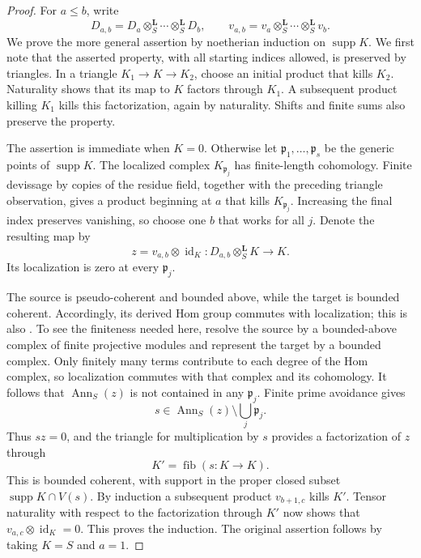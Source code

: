 \documentclass[11pt]{article}
\numberwithin{equation}{section}
\theoremstyle{definition}
\theoremstyle{remark}
\newcommand{\id}{\operatorname{id}}
\newcommand{\fib}{\operatorname{fib}}
\newcommand{\supp}{\operatorname{supp}}
\begin{document}
\begin{proof}
For $a\leq b$, write
\[
 D_{a,b}=D_a\otimes_S^{\mathbf L}\cdots\otimes_S^{\mathbf L}D_b,
 \qquad v_{a,b}=v_a\otimes_S^{\mathbf L}\cdots
                         \otimes_S^{\mathbf L}v_b.
\]
We prove the more general assertion by noetherian induction on
$\supp K$.  We first note that the asserted property, with all starting
indices allowed, is preserved by triangles.  In a triangle
$K_1\to K\to K_2$, choose an initial product that kills $K_2$.  Naturality
shows that its map to $K$ factors through $K_1$.  A subsequent product
killing $K_1$ kills this factorization, again by naturality.  Shifts and
finite sums also preserve the property.

The assertion is immediate when $K=0$.  Otherwise let
$\mathfrak p_1,\ldots,\mathfrak p_s$ be the generic points of
$\supp K$.  The localized complex $K_{\mathfrak p_j}$ has finite-length
cohomology.  Finite devissage by copies of the residue field, together
with the preceding triangle observation, gives a product beginning at
$a$ that kills $K_{\mathfrak p_j}$.  Increasing the final index preserves
vanishing, so choose one $b$ that works for all $j$.  Denote the resulting
map by
\[
 z=v_{a,b}\otimes\id_K:D_{a,b}\otimes_S^{\mathbf L}K\longrightarrow K.
\]
Its localization is zero at every $\mathfrak p_j$.

The source is pseudo-coherent and bounded above, while the target is
bounded coherent.  Accordingly, its derived Hom group commutes with
localization; this is also \cite[Lemma~15.101.2(3)]{Boundary:StacksHom}.  To see the finiteness needed here, resolve the source by
a bounded-above complex of finite projective modules and represent the
target by a bounded complex.  Only finitely many terms contribute to
each degree of the Hom complex, so localization commutes with that
complex and its cohomology.  It follows that $\operatorname{Ann}_S(z)$
is not contained in any $\mathfrak p_j$.  Finite prime avoidance gives
\[
 s\in\operatorname{Ann}_S(z)\setminus\bigcup_j\mathfrak p_j.
\]
Thus $sz=0$, and the triangle for multiplication by $s$ provides a
factorization of $z$ through
\[
 K'=\fib(s:K\longrightarrow K).
\]
This is bounded coherent, with support in the proper closed subset
$\supp K\cap V(s)$.  By induction a subsequent product $v_{b+1,c}$
kills $K'$.  Tensor naturality with respect to the factorization through
$K'$ now shows that $v_{a,c}\otimes\id_K=0$.  This proves the induction.
The original assertion follows by taking $K=S$ and $a=1$.
\end{proof}
\end{document}
